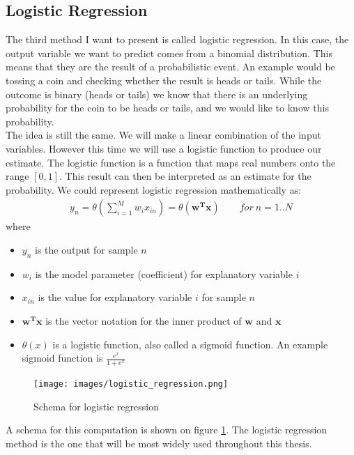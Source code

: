 \subsection{Logistic Regression}
\label{subsec:glm-logistic-regression}
The third method I want to present is called logistic regression\cite{caltechmachinelearning}\cite{wikilogistic}. In this case, the output variable we want to predict comes from a binomial distribution. This means that they are the result of a probabilistic event. An example would be tossing a coin and checking whether the result is heads or tails. While the outcome is binary (heads or tails) we know that there is an underlying probability for the coin to be heads or tails, and we would like to know this probability. \\
The idea is still the same. We will make a linear combination of the input variables. However this time we will use a logistic function to produce our estimate. The logistic function is a function that maps real numbers onto the range $[0,1]$. This result can then be interpreted as an estimate for the probability. We could represent logistic regression mathematically as:
\begin{equation}
\begin{split}
y_{n} = \theta(\sum_{i=1}^{M}w_{i}x_{in})= \theta(\bm{w^{T}x}) \qquad for\ n=1..N
\end{split}
\end{equation}
where
\begin{itemize}
	\item $y_{n}$ is the output for sample $n$
	\item $w_{i}$ is the model parameter (coefficient) for explanatory variable $i$
	\item $x_{in}$ is the value for explanatory variable $i$ for sample $n$
	\item $\bm{w^{T}x}$ is the vector notation for the inner product of $\bm{w}$ and $\bm{x}$
	\item $\theta(x)$ is a logistic function, also called a sigmoid function. An example sigmoid function is $\frac{e^{x}}{1+e^{x}}$
\end{itemize}
\begin{figure}
	\centering
	\texttt{[image: images/logistic\_regression.png]}
	\caption{Schema for logistic regression}
	\label{fig:glm-logistic-regression}
\end{figure}
A schema for this computation is shown on figure \ref{fig:glm-logistic-regression}.
The logistic regression method is the one that will be most widely used throughout this thesis.

